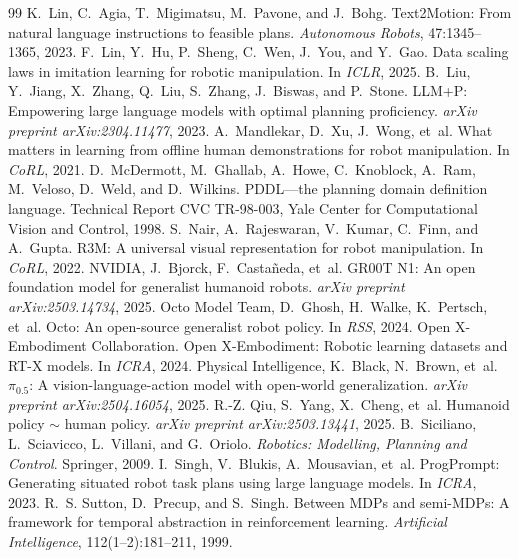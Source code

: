\documentclass[10pt,twocolumn,letterpaper]{article}
\begin{document}
\begin{thebibliography}{99}
 K.~Lin, C.~Agia, T.~Migimatsu, M.~Pavone, and J.~Bohg. Text2Motion: From natural language instructions to feasible plans. \emph{Autonomous Robots}, 47:1345--1365, 2023.
 F.~Lin, Y.~Hu, P.~Sheng, C.~Wen, J.~You, and Y.~Gao. Data scaling laws in imitation learning for robotic manipulation. In \emph{ICLR}, 2025.
 B.~Liu, Y.~Jiang, X.~Zhang, Q.~Liu, S.~Zhang, J.~Biswas, and P.~Stone. LLM+P: Empowering large language models with optimal planning proficiency. \emph{arXiv preprint arXiv:2304.11477}, 2023.
 A.~Mandlekar, D.~Xu, J.~Wong, et~al. What matters in learning from offline human demonstrations for robot manipulation. In \emph{CoRL}, 2021.
 D.~McDermott, M.~Ghallab, A.~Howe, C.~Knoblock, A.~Ram, M.~Veloso, D.~Weld, and D.~Wilkins. PDDL---the planning domain definition language. Technical Report CVC TR-98-003, Yale Center for Computational Vision and Control, 1998.
 S.~Nair, A.~Rajeswaran, V.~Kumar, C.~Finn, and A.~Gupta. R3M: A universal visual representation for robot manipulation. In \emph{CoRL}, 2022.
 NVIDIA, J.~Bjorck, F.~Castañeda, et~al. GR00T N1: An open foundation model for generalist humanoid robots. \emph{arXiv preprint arXiv:2503.14734}, 2025.
 Octo Model Team, D.~Ghosh, H.~Walke, K.~Pertsch, et~al. Octo: An open-source generalist robot policy. In \emph{RSS}, 2024.
 Open X-Embodiment Collaboration. Open X-Embodiment: Robotic learning datasets and RT-X models. In \emph{ICRA}, 2024.
 Physical Intelligence, K.~Black, N.~Brown, et~al. $\pi_{0.5}$: A vision-language-action model with open-world generalization. \emph{arXiv preprint arXiv:2504.16054}, 2025.
 R.-Z. Qiu, S.~Yang, X.~Cheng, et~al. Humanoid policy $\sim$ human policy. \emph{arXiv preprint arXiv:2503.13441}, 2025.
 B.~Siciliano, L.~Sciavicco, L.~Villani, and G.~Oriolo. \emph{Robotics: Modelling, Planning and Control}. Springer, 2009.
 I.~Singh, V.~Blukis, A.~Mousavian, et~al. ProgPrompt: Generating situated robot task plans using large language models. In \emph{ICRA}, 2023.
 R.~S. Sutton, D.~Precup, and S.~Singh. Between MDPs and semi-MDPs: A framework for temporal abstraction in reinforcement learning. \emph{Artificial Intelligence}, 112(1--2):181--211, 1999.

\end{thebibliography}
\end{document}
